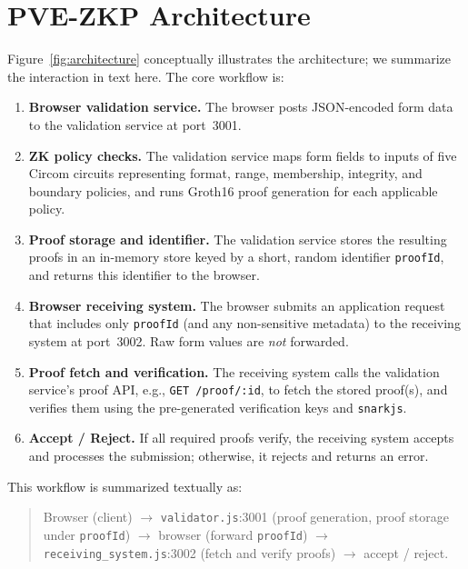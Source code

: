 \documentclass[conference]{IEEEtran}
\begin{document}
\section{PVE-ZKP Architecture}

Figure~\ref{fig:architecture} conceptually illustrates the architecture; we
summarize the interaction in text here. The core workflow is:

\begin{enumerate}[leftmargin=*]
  \item \textbf{Browser \textrightarrow{} validation service.} The browser posts
    JSON-encoded form data to the validation service at port~3001.
  \item \textbf{ZK policy checks.} The validation service maps form fields to
    inputs of five Circom circuits representing format, range, membership,
    integrity, and boundary policies, and runs Groth16 proof generation for each
    applicable policy.
  \item \textbf{Proof storage and identifier.} The validation service stores the
    resulting proofs in an in-memory store keyed by a short, random identifier
    \texttt{proofId}, and returns this identifier to the browser.
  \item \textbf{Browser \textrightarrow{} receiving system.} The browser submits
    an application request that includes only \texttt{proofId} (and any
    non-sensitive metadata) to the receiving system at port~3002. Raw form
    values are \emph{not} forwarded.
  \item \textbf{Proof fetch and verification.} The receiving system calls the
    validation service's proof API, e.g., \texttt{GET /proof/:id}, to fetch the
    stored proof(s), and verifies them using the pre-generated verification keys
    and \texttt{snarkjs}.
  \item \textbf{Accept / Reject.} If all required proofs verify, the receiving
    system accepts and processes the submission; otherwise, it rejects and
    returns an error.
\end{enumerate}

This workflow is summarized textually as:
\begin{quote}
Browser (client) $\rightarrow$ \texttt{validator.js}:3001 (proof generation,
proof storage under \texttt{proofId}) $\rightarrow$ browser (forward
\texttt{proofId}) $\rightarrow$ \texttt{receiving\_system.js}:3002 (fetch and
verify proofs) $\rightarrow$ accept / reject.
\end{quote}
\end{document}
